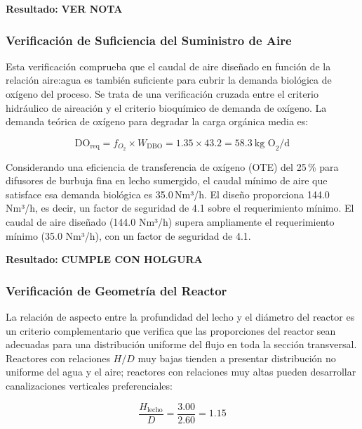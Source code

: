 \textbf{Resultado:} \textbf{VER NOTA}

\subsubsection*{Verificación de Suficiencia del Suministro de Aire}

Esta verificación comprueba que el caudal de aire diseñado en función de la relación aire:agua es también suficiente para cubrir la demanda biológica de oxígeno del proceso. Se trata de una verificación cruzada entre el criterio hidráulico de aireación y el criterio bioquímico de demanda de oxígeno. La demanda teórica de oxígeno para degradar la carga orgánica media es:

\begin{equation}
\text{DO}_{\text{req}} = f_{O_2} \times W_{\text{DBO}} = 1.35 \times 43.2 = 58.3\ \text{kg O}_2\text{/d}
\end{equation}

Considerando una eficiencia de transferencia de oxígeno (OTE) del 25\,\% para difusores de burbuja fina en lecho sumergido, el caudal mínimo de aire que satisface esa demanda biológica es 35.0\,Nm³/h. El diseño proporciona 144.0\,Nm³/h, es decir, un factor de seguridad de 4.1 sobre el requerimiento mínimo. El caudal de aire diseñado (144.0 Nm³/h) supera ampliamente el requerimiento mínimo (35.0 Nm³/h), con un factor de seguridad de 4.1.

\textbf{Resultado:} \textbf{CUMPLE CON HOLGURA}

\subsubsection*{Verificación de Geometría del Reactor}

La relación de aspecto entre la profundidad del lecho y el diámetro del reactor es un criterio complementario que verifica que las proporciones del reactor sean adecuadas para una distribución uniforme del flujo en toda la sección transversal. Reactores con relaciones $H/D$ muy bajas tienden a presentar distribución no uniforme del agua y el aire; reactores con relaciones muy altas pueden desarrollar canalizaciones verticales preferenciales:

\begin{equation}
\frac{H_{\text{lecho}}}{D} = \frac{3.00}{2.60} = 1.15
\end{equation}

